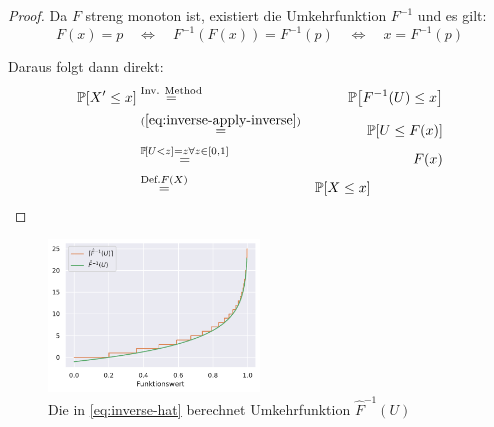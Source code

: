 \begin{proof}
    \noindent Da $F$ streng monoton ist, existiert die Umkehrfunktion $F^{-1}$ und es gilt:
    \begin{equation}\label{eq:inverse-apply-inverse}
        F(x) = p
        \quad\Leftrightarrow\quad F^{-1}(F(x)) = F^{-1}(p)
        \quad\Leftrightarrow\quad x = F^{-1}(p)
    \end{equation}

    \noindent Daraus folgt dann direkt:
    \begin{eqnarray}
        \prob{X' \le x} &\stackrel{\text{Inv. Method}} = & \prob{F^{-1}(U) \le x} \\
        &\stackrel{(\ref{eq:inverse-apply-inverse})}{=}& \prob{U \le F(x)} \\
        &\stackrel{\prob{U < z} = z \forall z \in [0, 1]}=& F(x) \\
        &\stackrel{\text{Def.} F(X)}=& \prob{X \le x} \hspace{5em}\hfill \qedhere
    \end{eqnarray}
\end{proof}

\bigskip
\bigskip

\begin{figure}
    \begin{center}
        \includegraphics[width=0.5\textwidth]{data/geometric-distr-inv_hat.pdf}
    \end{center}
    \caption{Die in \cref{eq:inverse-hat} berechnet Umkehrfunktion $\hat F^{-1}(U)$}

\end{figure}

